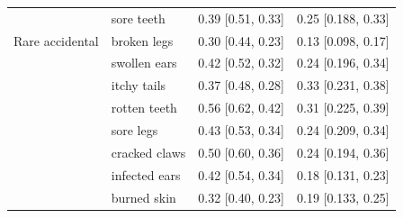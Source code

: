 \documentclass[12pt,letterpaper]{article}
\begin{document}
\begin{table}[h]
\begin{tabular}{| l || l | l | l |}
                  & sore teeth         & 0.39 {[}0.51, 0.33{]}   & 0.25 {[}0.188, 0.33{]}       \\
Rare accidental   & broken legs        & 0.30 {[}0.44, 0.23{]}   & 0.13 {[}0.098, 0.17{]}       \\
                  & swollen ears       & 0.42 {[}0.52, 0.32{]}   & 0.24 {[}0.196, 0.34{]}       \\
                  & itchy tails        & 0.37 {[}0.48, 0.28{]}   & 0.33 {[}0.231, 0.38{]}       \\
                  & rotten teeth       & 0.56 {[}0.62, 0.42{]}   & 0.31 {[}0.225, 0.39{]}       \\
                  & sore legs          & 0.43 {[}0.53, 0.34{]}   & 0.24 {[}0.209, 0.34{]}       \\
                  & cracked claws      & 0.50 {[}0.60, 0.36{]}   & 0.24 {[}0.194, 0.36{]}       \\
                  & infected ears      & 0.42 {[}0.54, 0.34{]}   & 0.18 {[}0.131, 0.23{]}       \\
                  & burned skin        & 0.32 {[}0.40, 0.23{]}   & 0.19 {[}0.133, 0.25{]}      \\
                         \hline

\end{tabular}
\end{table}
    
\end{document}
